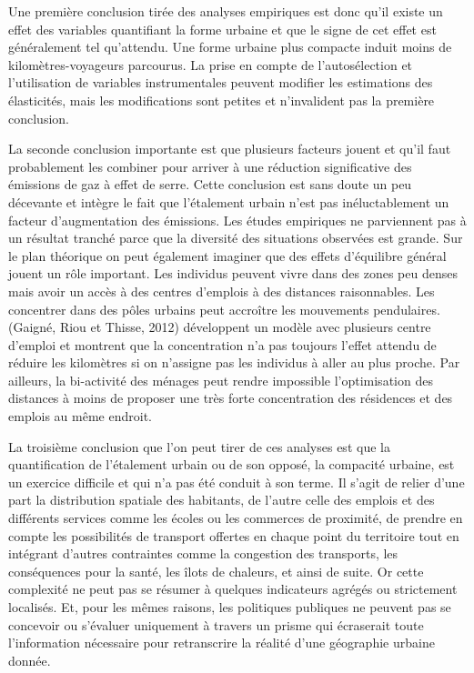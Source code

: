 \documentclass[
  9pt,
  a4paper,
  DIV=11]{scrreprt}
\begin{document}
Une première conclusion tirée des analyses empiriques est donc qu'il
existe un effet des variables quantifiant la forme urbaine et que le
signe de cet effet est généralement tel qu'attendu. Une forme urbaine
plus compacte induit moins de kilomètres-voyageurs parcourus. La prise
en compte de l'autosélection et l'utilisation de variables
instrumentales peuvent modifier les estimations des élasticités, mais
les modifications sont petites et n'invalident pas la première
conclusion.

La seconde conclusion importante est que plusieurs facteurs jouent et
qu'il faut probablement les combiner pour arriver à une réduction
significative des émissions de gaz à effet de serre. Cette conclusion
est sans doute un peu décevante et intègre le fait que l'étalement
urbain n'est pas inéluctablement un facteur d'augmentation des
émissions. Les études empiriques ne parviennent pas à un résultat
tranché parce que la diversité des situations observées est grande. Sur
le plan théorique on peut également imaginer que des effets d'équilibre
général jouent un rôle important. Les individus peuvent vivre dans des
zones peu denses mais avoir un accès à des centres d'emplois à des
distances raisonnables. Les concentrer dans des pôles urbains peut
accroître les mouvements pendulaires. (Gaigné, Riou et Thisse, 2012)
développent un modèle avec plusieurs centre d'emploi et montrent que la
concentration n'a pas toujours l'effet attendu de réduire les kilomètres
si on n'assigne pas les individus à aller au plus proche. Par ailleurs,
la bi-activité des ménages peut rendre impossible l'optimisation des
distances à moins de proposer une très forte concentration des
résidences et des emplois au même endroit.

La troisième conclusion que l'on peut tirer de ces analyses est que la
quantification de l'étalement urbain ou de son opposé, la compacité
urbaine, est un exercice difficile et qui n'a pas été conduit à son
terme. Il s'agit de relier d'une part la distribution spatiale des
habitants, de l'autre celle des emplois et des différents services comme
les écoles ou les commerces de proximité, de prendre en compte les
possibilités de transport offertes en chaque point du territoire tout en
intégrant d'autres contraintes comme la congestion des transports, les
conséquences pour la santé, les îlots de chaleurs, et ainsi de suite. Or
cette complexité ne peut pas se résumer à quelques indicateurs agrégés
ou strictement localisés. Et, pour les mêmes raisons, les politiques
publiques ne peuvent pas se concevoir ou s'évaluer uniquement à travers
un prisme qui écraserait toute l'information nécessaire pour
retranscrire la réalité d'une géographie urbaine donnée.
\end{document}
